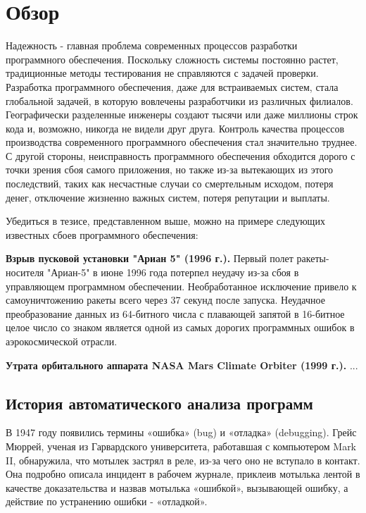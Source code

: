 \chapter{Обзор}\label{ch:ch1}
Надежность - главная проблема современных процессов разработки программного обеспечения. Поскольку сложность системы постоянно растет, традиционные 
методы тестирования не справляются с задачей проверки. Разработка программного обеспечения, даже для встраиваемых систем, стала глобальной задачей, в 
которую вовлечены разработчики из различных филиалов. Географически разделенные инженеры создают тысячи или даже миллионы строк кода и, возможно, 
никогда не видели друг друга. Контроль качества процессов производства современного программного обеспечения стал значительно труднее. С другой стороны, 
неисправность программного обеспечения обходится дорого с точки зрения сбоя самого приложения, но также из-за вытекающих из этого последствий, таких как 
несчастные случаи со смертельным исходом, потеря денег, отключение жизненно важных систем, потеря репутации и выплаты.

Убедиться в тезисе, представленном выше, можно на примере следующих известных сбоев программного обеспечения:

\textbf{Взрыв пусковой установки "Ариан 5" (1996 г.).} Первый полет ракеты-носителя "Ариан-5" в июне 1996 года потерпел неудачу из-за сбоя в управляющем 
программном обеспечении. Необработанное исключение привело к самоуничтожению ракеты всего через 37 секунд после запуска. Неудачное преобразование 
данных из 64-битного числа с плавающей запятой в 16-битное целое число со знаком является одной из самых дорогих программных ошибок в аэрокосмической отрасли\cite{Lions1996ARIANE5F}.

\textbf{Утрата орбитального аппарата NASA Mars Climate Orbiter (1999 г.).} ... %

\section{История автоматического анализа программ}\label{sec:ch1/sec1}
В 1947 году появились термины «ошибка» (bug) и «отладка» (debugging). Грейс Мюррей, 
ученая из Гарвардского университета, работавшая с компьютером Mark II, обнаружила, 
что мотылек застрял в реле, из-за чего оно не вступало в контакт. Она подробно 
описала инцидент в рабочем журнале, приклеив мотылька лентой в качестве доказательства и 
назвав мотылька «ошибкой», вызывающей ошибку, а действие по устранению ошибки - «отладкой».

